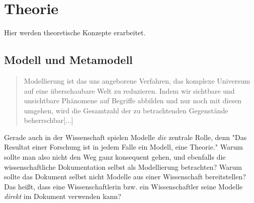 




\chapter{Theorie}

Hier werden theoretische Konzepte erarbeitet.

\section{Modell und Metamodell}

\begin{quote}
Modellierung ist das uns angeborene Verfahren, das komplexe Universum auf eine überschaubare Welt zu reduzieren. Indem wir sichtbare und unsichtbare Phänomene auf Begriffe abbilden und nur noch mit diesen umgehen, wird die Gesamtzahl der zu betrachtenden Gegenstände beherrschbar[...]
\citep[S.~7]{ludewig}
\end{quote}

Gerade auch in der Wissenschaft spielen Modelle \emph{die} zentrale Rolle, denn
"Das Resultat einer Forschung ist in jedem Falle ein Modell, eine Theorie." \citep[S.~8]{ludewig}
Warum sollte man also nicht den Weg ganz konsequent gehen, und ebenfalls die wissenschaftliche
Dokumentation selbst als Modellierung betrachten?
Warum sollte das Dokument selbst nicht Modelle aus einer Wissenschaft bereitstellen?
Das heißt, dass eine Wissenschaftlerin bzw. ein Wissenschaftler seine Modelle \emph{direkt}
im Dokument verwenden kann?

